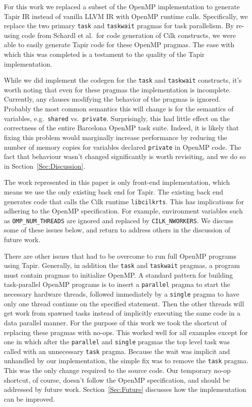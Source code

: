 \documentclass[sigconf]{acmart}
\begin{document}
For this work we replaced a subset of the OpenMP implementation to generate
Tapir IR instead of vanilla LLVM IR with OpenMP runtime calls. Specifically, we
replace the two primary \texttt{task} and \texttt{taskwait} pragmas for task
parallelism. By re-using code from Schardl et al.\ for code generation of Cilk
constructs, we were able to easily generate Tapir code for these OpenMP
pragmas. The ease with which this was completed is a testament to the quality
of the Tapir implementation. 

While we did implement the codegen for the \texttt{task} and
\texttt{taskwait} constructs, it's worth noting that even for these pragmas
the implementation is incomplete. Currently, any clauses modifying the behavior
of the pragmas is ignored. Probably the most common semantics this will change
is for the semantics of variables, e.g.\ \texttt{shared} vs.\ \texttt{private}.
Surprisingly, this had little effect on the correctness of the entire Barcelona
OpenMP task suite. Indeed, it is likely that fixing this problem would
marginally increase performance by reducing the number of memory copies for
variables declared \texttt{private} in OpenMP code.  The fact that behaviour
wasn't changed significantly is worth revisiting, and we do so in
Section~\ref{Sec:Discussion}. 

The work represented in this paper is only front-end implementation, which
means we use the only existing back end for Tapir. The existing back end
generates code that calls the Cilk runtime \texttt{libcilkrts}. This has
implications for adhering to the OpenMP specification. For example, environment
variables such as \texttt{OMP\_NUM\_THREADS} are ignored and replaced by
\texttt{CILK\_NWORKERS}.  We discuss some of these issues below, and return to
address others in the discussion of future work.

There are other issues that had to be overcome to run full OpenMP programs
using Tapir. Generally, in addition the \texttt{task} and \texttt{taskwait}
pragmas, a program must contain pragmas to initialize OpenMP.  A standard
pattern for building task-parallel OpenMP programs is to insert a
\texttt{parallel} pragma to start the necessary hardware threads, followed
immediately by a \texttt{single} pragma to have only one thread continue on the
specified statement. Then the other threads will get work from spawned tasks
instead of implicitly executing the same code in a data parallel manner. For
the purpose of this work we took the shortcut of replacing these pragmas with
no-ops. This worked well for all examples except for one in which after the
\texttt{parallel} and \texttt{single} pragmas the top level task was called
with an unnecessary \texttt{task} pragma.  Because the wait was implicit and
unhandled by our implementation, the simple fix was to remove the \texttt{task}
pragma. This was the only change required to the source code. Our temporary
no-op shortcut, of course, doesn't follow the OpenMP specification, and should
be addressed by future work. Section~\ref{Sec:Future} discusses how the
implementation can be improved.
\end{document}
